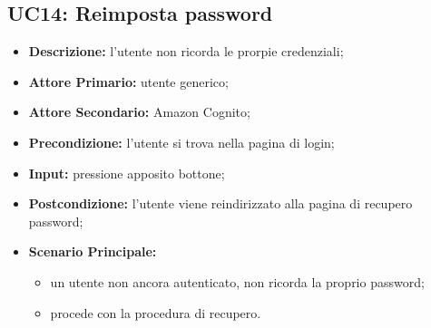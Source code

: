 \subsection{UC14: Reimposta password}
\label{sec:UC14}
\begin{itemize}
    \item \textbf{Descrizione:} l'utente non ricorda le prorpie credenziali;
    \item \textbf{Attore Primario:} utente generico;
    \item \textbf{Attore Secondario:} Amazon Cognito;
    \item \textbf{Precondizione:} l'utente si trova nella pagina di login;
    \item \textbf{Input:} pressione apposito bottone;
    \item \textbf{Postcondizione:} l'utente viene reindirizzato alla pagina di recupero password;
    \item \textbf{Scenario Principale:}
    \begin{itemize}
        \item un utente non ancora autenticato, non ricorda la proprio password;
        \item procede con la procedura di recupero.
    \end{itemize}
\end{itemize}
